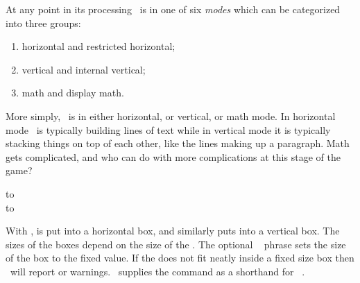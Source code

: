 \begin{comment}
\begin{syntax}
\cmd{\vfil} \cmd{\vfill} \cmd{\vfilneg} \cmd{\vss} \\
\end{syntax}
These commands are all \tx\ primitives and are equivalent to vertical 
skips with some kind of infinite glue, as indicated below:
\begin{lcode}
\vfil     -> \vskip 0pt plus 1fil
\vfill    -> \vskip 0pt plus 1fill
\vfilneg  -> \vskip 0pt           minus 1fil
\vss      -> \vskip 0pt plus 1fil minus 1fil
\end{lcode}

\end{comment}

    At any point in its processing \tx\ is in one of six 
\emph{modes} which can be categorized into three groups:
\begin{enumerate}
\item horizontal and restricted 
      horizontal;
\item vertical and internal 
      vertical;
\item math and display 
      math.
\end{enumerate}
More simply, \tx\ is in either horizontal, or vertical, or math mode.
In horizontal mode \tx\ is typically building lines of text while in
vertical mode it is typically stacking things on top of each other, 
like the lines making up a paragraph. 
Math gets complicated, and who can do with more complications
at this stage of the game?

\begin{syntax}
\cmd{\hbox} to  \cmd{\hb@xt@} \\
\cmd{\vbox} to  \\
\end{syntax}
With \cmd{\hbox},  is put into a horizontal box, and similarly
\cmd{\vbox} puts  into a vertical box. The sizes of the boxes
depend on the size of the . The optional
~ phrase sets the size of the box to the fixed
 value. If the
 does not fit neatly inside a fixed size box then \tx\
will report  or  warnings. \ltx\ supplies
the \cmd{\hb@xt@} command as a shorthand for \cmd{\hbox}~\Itt{to}.

